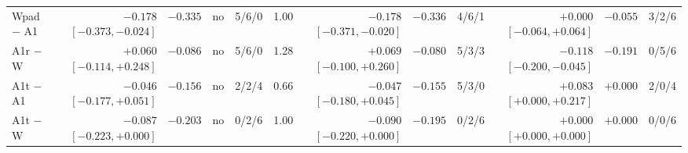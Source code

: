 \begin{table}[t]
\begin{tabular}{l rrrr r rrr rrr}
Wpad $-$ A1 & $-0.178$ $[-0.373, -0.024]$ & $-0.335$ & no & 5/6/0 & 1.00 & $-0.178$ $[-0.371, -0.020]$ & $-0.336$ & 4/6/1 & $+0.000$ $[-0.064, +0.064]$ & $-0.055$ & 3/2/6\\
A1r $-$ W & $+0.060$ $[-0.114, +0.248]$ & $-0.086$ & no & 5/6/0 & 1.28 & $+0.069$ $[-0.100, +0.260]$ & $-0.080$ & 5/3/3 & $-0.118$ $[-0.200, -0.045]$ & $-0.191$ & 0/5/6\\
A1t $-$ A1 & $-0.046$ $[-0.177, +0.051]$ & $-0.156$ & no & 2/2/4 & 0.66 & $-0.047$ $[-0.180, +0.045]$ & $-0.155$ & 5/3/0 & $+0.083$ $[+0.000, +0.217]$ & $+0.000$ & 2/0/4\\
A1t $-$ W & $-0.087$ $[-0.223, +0.000]$ & $-0.203$ & no & 0/2/6 & 1.00 & $-0.090$ $[-0.220, +0.000]$ & $-0.195$ & 0/2/6 & $+0.000$ $[+0.000, +0.000]$ & $+0.000$ & 0/0/6\\
\bottomrule\end{tabular}\end{table}
